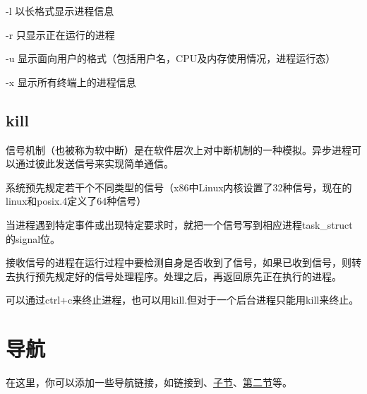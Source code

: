 \documentclass{ctexart}
\begin{document}
-l 以长格式显示进程信息

-r 只显示正在运行的进程

-u 显示面向用户的格式（包括用户名，CPU及内存使用情况，进程运行态）

-x 显示所有终端上的进程信息

\subsection{kill}
信号机制（也被称为软中断）是在软件层次上对中断机制的一种模拟。异步进程可以通过彼此发送信号来实现简单通信。

系统预先规定若干个不同类型的信号（x86中Linux内核设置了32种信号，现在的linux和posix.4定义了64种信号）

当进程遇到特定事件或出现特定要求时，就把一个信号写到相应进程task\_struct的signal位。

接收信号的进程在运行过程中要检测自身是否收到了信号，如果已收到信号，则转去执行预先规定好的信号处理程序。处理之后，再返回原先正在执行的进程。

可以通过ctrl+c来终止进程，也可以用kill.但对于一个后台进程只能用kill来终止。


\clearpage

\section*{导航}
\label{sec:navigation}

在这里，你可以添加一些导航链接，如链接到、\hyperref[subsec:sub]{子节}、\hyperref[sec:second]{第二节}等。
\end{document}
